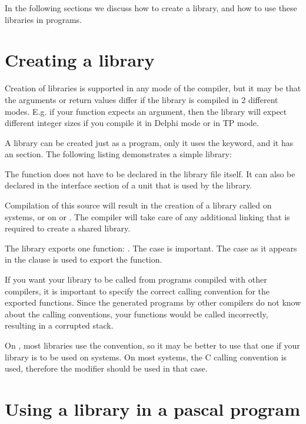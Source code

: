 {In the following sections we discuss how to create a library, and how
to use these libraries in programs.

\section{Creating a library}

Creation of libraries is supported in any mode of the \fpc compiler,
but it may be that the arguments or return values differ if the library is
compiled in 2 different modes.  E.g. if your function expects an
 argument, then the library will expect different integer
sizes if you compile it in Delphi mode or in TP mode.

A library can be created just as a program, only it uses the 
keyword, and it has an  section. The following listing
demonstrates a simple library:


The function  does not have to be declared in the library file
itself. It can also be declared in the interface section of a unit that
is used by the library.

Compilation of this source will result in the creation of a library called
 on \unix systems, or  on \windows or \ostwo.
The compiler will take care of any additional linking that is required to create a
shared library.

The library exports one function: . The case is important. The
case as it appears in the  clause is used to export the
function.

If you want your library to be called from programs compiled with
other compilers, it is important to specify the correct calling
convention for the exported functions. Since the generated programs
by other compilers do not know about the \fpc calling conventions,
your functions would be called incorrectly, resulting in a corrupted
stack.


On \windows, most libraries use the  convention, so it may be
better to use that one if your library is to be used on \windows systems. On
most \unix systems, the C calling convention is used, therefore the
 modifier should be used in that case.

\section{Using a library in a pascal program}

}

